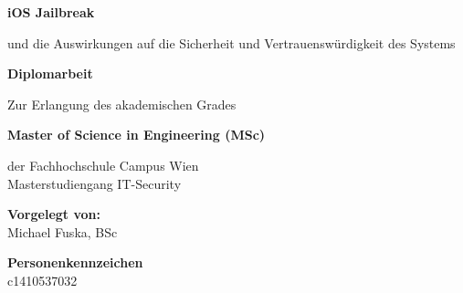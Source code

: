 \begin{center}

\vspace{1.3cm}

\hspace*{-1.0cm} {\Large \textbf{iOS Jailbreak\\}}

\hspace*{-1.0cm} und die Auswirkungen auf die Sicherheit und Vertrauenswürdigkeit des Systems \\

\vspace{2.2cm}

\hspace*{-1.0cm} \textbf{Diplomarbeit\\}

\vspace{0.65cm}

\hspace*{-1.0cm} Zur Erlangung des akademischen Grades \\

\vspace{0.65cm}

\hspace*{-1.0cm} \textbf{Master of Science in Engineering (MSc)\\}

\vspace{0.65cm}

\hspace*{-1.0cm} der Fachhochschule Campus Wien \\
\hspace*{-1.0cm} Masterstudiengang IT-Security \\

\vspace{5cm}

\hspace*{-1.0cm} \textbf{Vorgelegt von:} \\
\hspace*{-1.0cm} Michael Fuska, BSc \\

\vspace{0.65cm}

\hspace*{-1.0cm} \textbf{Personenkennzeichen}\\
\hspace*{-1.0cm} c1410537032 \\

\vspace{2.1cm}


\end{center}
